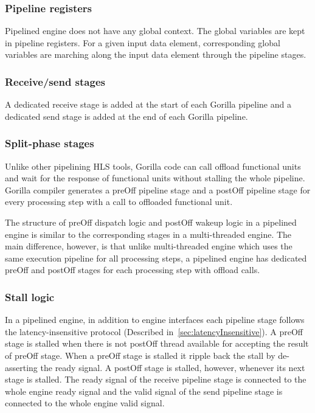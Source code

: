 \documentclass[a4paper, 12pt]{report}
\begin{document}
\subsubsection{Pipeline registers}
Pipelined engine does not have any global context. 
The global variables are kept in pipeline registers.
For a given input data element, corresponding global 
variables are marching along the input data element 
through the pipeline stages.

\subsubsection{Receive/send stages}
A dedicated receive stage is added at the start of each 
Gorilla pipeline and a dedicated send stage is added at the 
end of each Gorilla pipeline.

\subsubsection{Split-phase stages}
\label{sec:splitPhasePipelining}
Unlike other pipelining HLS tools, Gorilla code can call 
offload functional units and wait for the response of 
functional units without stalling the whole pipeline.
Gorilla compiler generates a preOff pipeline stage and a 
postOff pipeline stage for every processing step with a 
call to offloaded functional unit.

The structure of preOff dispatch logic and postOff wakeup 
logic in a pipelined engine is similar to the corresponding 
stages in a multi-threaded engine. The main difference, however, 
is that unlike multi-threaded engine which uses the same execution 
pipeline for all processing steps, a pipelined engine has dedicated 
preOff and postOff stages for each processing step 
with offload calls. 

\subsubsection{Stall logic}
In a pipelined engine, in addition to engine interfaces
each pipeline stage follows the latency-insensitive 
protocol (Described in~\ref{sec:latencyInsensitive}). 
A preOff stage is stalled when there is not postOff thread 
available for accepting the result of preOff stage. When a 
preOff stage is stalled it ripple back the stall by 
de-asserting the ready signal. A postOff stage is stalled, 
however, whenever its next stage is stalled.
The ready signal of the receive pipeline stage is connected to the 
whole engine ready signal and the valid signal of the send pipeline 
stage is connected to the whole engine valid signal.
\end{document}

